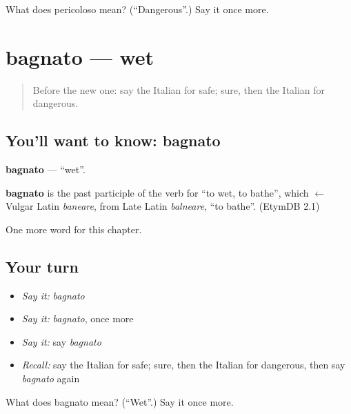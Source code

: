 \begin{tcolorbox}[breakable,colback=teal!4,colframe=teal!35!black,title={Before you move on}]
What does pericoloso mean? (\textquotedblleft{}Dangerous\textquotedblright{}.) Say it once more.
\end{tcolorbox}
\section[bagnato]{bagnato — wet}

\label{lesson:IT-C128-bagnato}



\begin{quote}
Before the new one: say the Italian for safe; sure, then the Italian for dangerous.
\end{quote}

\subsection*{You'll want to know: bagnato}
\textbf{bagnato} — \textquotedblleft{}wet\textquotedblright{}.

\begin{cousinweb}
\textbf{bagnato} is the past participle of the verb for \textquotedblleft{}to wet, to bathe\textquotedblright{}, which $\leftarrow$ Vulgar Latin \emph{baneare}, from Late Latin \emph{balneare}, \textquotedblleft{}to bathe\textquotedblright{}. (EtymDB 2.1)
\end{cousinweb}

\begin{grammarlens}[title={What you've built}]
One more word for this chapter.
\end{grammarlens}

\subsection*{Your turn}
\begin{itemize}
\raggedright
  \item \emph{Say it:} \emph{bagnato}
  \item \emph{Say it:} \emph{bagnato}, once more
  \item \emph{Say it:} say \emph{bagnato}
  \item \emph{Recall:} say the Italian for safe; sure, then the Italian for dangerous, then say \emph{bagnato} again
\end{itemize}

\begin{tcolorbox}[breakable,colback=teal!4,colframe=teal!35!black,title={Before you move on}]
What does bagnato mean? (\textquotedblleft{}Wet\textquotedblright{}.) Say it once more.
\end{tcolorbox}
